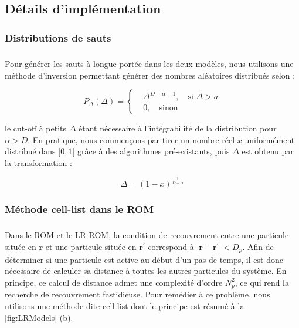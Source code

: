 \subsection{Détails d'implémentation}

\label{sec:DetImpl}

\subsubsection{Distributions de sauts}

\subparagraph{}Pour générer les sauts à longue portée dans les deux modèles, nous utilisons une méthode d'inversion \cite{devroye_general_1986} permettant générer des nombres aléatoires distribués selon :

\begin{equation}
	P_\Delta(\Delta) = \left\{
	\begin{aligned}
	& \Delta^{D-\alpha-1},\quad \text{si } \Delta > a\\
	& 0, \quad \text{sinon}
	\end{aligned}\right.
\end{equation}

\noindent le cut-off à petits $\Delta$ étant nécessaire à l'intégrabilité de la distribution pour $\alpha > D$. En pratique, nous commençons par tirer un nombre réel $x$ uniformément distribué dans $[0,1[$ grâce à des algorithmes pré-existants, puis $\Delta$ est obtenu par la transformation :

\begin{equation}
	\Delta = (1-x)^\frac{1}{D-\alpha}
\end{equation}

\subsubsection{Méthode cell-list dans le ROM}

\subparagraph{}Dans le ROM et le LR-ROM, la condition de recouvrement entre une particule située en $\mathbf{r}$ et une particule située en $\mathbf{r}^\prime$ correspond à $|\mathbf{r}-\mathbf{r}^\prime|<D_p$. Afin de déterminer si une particule est active au début d'un pas de temps, il est donc nécessaire de calculer sa distance à toutes les autres particules du système. En principe, ce calcul de distance admet une complexité d'ordre $N_p^2$, ce qui rend la recherche de recouvrement fastidieuse. Pour remédier à ce problème, nous utilisons une méthode dite cell-list \cite{allen_computer_2017} dont le principe est résumé à la \autoref{fig:LRModels}-(b).

